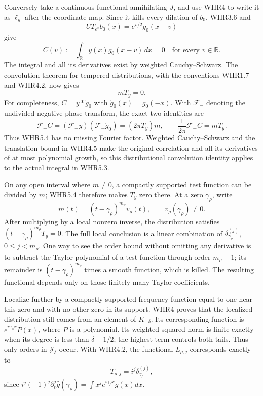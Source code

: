 Conversely take a continuous functional annihilating \(J\), and use WHR4
to write it as \(\ell_y\) after the coordinate map. Since it kills every
dilation of \(b_0\), WHR3.6 and \[
 U T_{e^v}b_0(x)=e^{v/2}g_0(x-v)
\] give \[
 C(v):=\int_{\mathbb R}y(x)g_0(x-v)\,dx=0
 \quad\text{for every }v\in\mathbb R.
 \tag{WHR5.3}
\] The integral and all its derivatives exist by weighted
Cauchy--Schwarz. The convolution theorem for tempered distributions,
with the conventions WHR1.7 and WHR4.2, now gives \[
 mT_y=0.
 \tag{WHR5.4}
\] For completeness, \(C=y*\check g_0\) with \(\check g_0(x)=g_0(-x)\).
With \(\mathcal F_-\) denoting the undivided negative-phase transform,
the exact two identities are \[
 \mathcal F_-C=(\mathcal F_-y)(\mathcal F_-\check g_0)
             =(2\pi T_y)m,\qquad
 \frac1{2\pi}\mathcal F_-C=mT_y.
\] Thus WHR5.4 has no missing Fourier factor. Weighted Cauchy--Schwarz
and the translation bound in WHR4.5 make the original correlation and
all its derivatives of at most polynomial growth, so this distributional
convolution identity applies to the actual integral in WHR5.3.

On any open interval where \(m\ne0\), a compactly supported test
function can be divided by \(m\); WHR5.4 therefore makes \(T_y\) zero
there. At a zero \(\gamma_\rho\), write \[
 m(t)=(t-\gamma_\rho)^{m_\rho}v_\rho(t),
 \qquad v_\rho(\gamma_\rho)\ne0.
\] After multiplying by a local nonzero inverse, the distribution
satisfies \((t-\gamma_\rho)^{m_\rho}T_y=0\). The full local conclusion
is a linear combination of \(\delta_{\gamma_\rho}^{(j)}\),
\(0\leq j<m_\rho\). One way to see the order bound without omitting any
derivative is to subtract the Taylor polynomial of a test function
through order \(m_\rho-1\); its remainder is
\((t-\gamma_\rho)^{m_\rho}\) times a smooth function, which is killed.
The resulting functional depends only on those finitely many Taylor
coefficients.

Localize further by a compactly supported frequency function equal to
one near this zero and with no other zero in its support. WHR4 proves
that the localized distribution still comes from an element of
\(K_{-\delta}\). Its corresponding function is
\(e^{i\gamma_\rho x}P(x)\), where \(P\) is a polynomial. Its weighted
squared norm is finite exactly when its degree is less than
\(\delta-1/2\); the highest term controls both tails. Thus only orders
in \(\mathscr J_\delta\) occur. With WHR4.2, the functional
\(L_{\rho,j}\) corresponds exactly to \[
 T_{\rho,j}=i^j\delta_{\gamma_\rho}^{(j)},
\] since \(i^j(-1)^j\partial_t^j\widehat g(\gamma_\rho)=
\int x^je^{i\gamma_\rho x}g(x)dx\).

